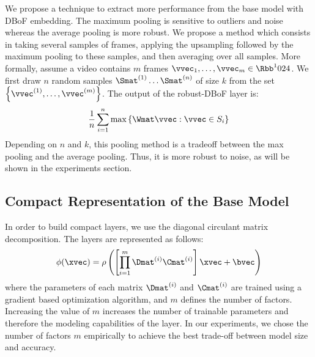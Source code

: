 We propose a technique to extract more performance from the base model with DBoF embedding.
The maximum pooling is sensitive to outliers and noise whereas the average pooling is more robust.
We propose a method which consists in taking several samples of frames, applying the upsampling followed by the maximum pooling to these samples, and then averaging over all samples.
More formally, assume a video contains $m$ frames $\vvec_1, \ldots, \vvec_m \in \Rbb^1024$.
We first draw $n$ random samples $\Smat^{(1)} \ldots \Smat^{(n)}$ of size $k$ from the set $\left\{ \vvec^{(1)}, \ldots, \vvec^{(m)} \right\}$.
The output of the robust-DBoF layer is:
\begin{equation}
  \frac{1}{n} \sum_{i=1}^{n} \max \left\{ \Wmat \vvec :\vvec \in S_{i} \right\} 
\end{equation}
\noindent
Depending on $n$ and $k$, this pooling method is a tradeoff between the max pooling and the average pooling.
Thus, it is more robust to noise, as will be shown in the experiments section.


\subsection{Compact Representation of the Base Model}
\label{subsection:ap2-compact_representation_of_the_base_model}


In order to build compact layers, we use the diagonal circulant matrix decomposition.
The layers are represented as follows:
\begin{equation}
  \phi(\xvec) = \rho\left(\left[\prod_{i=1}^{m} \Dmat^{(i)} \Cmat^{(i)} \right] \xvec + \bvec \right)
\end{equation}
where the parameters of each matrix $\Dmat^{(i)}$ and $\Cmat^{(i)}$ are trained using a gradient based optimization algorithm, and $m$ defines the number of factors.
Increasing the value of $m$ increases the number of trainable parameters and therefore the modeling capabilities of the layer.
In our experiments, we chose the number of factors $m$ empirically to achieve the best trade-off between model size and accuracy.

